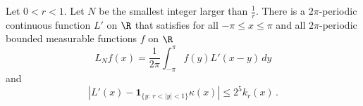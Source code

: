 \begin{lemma}\label{Dirichlet-approximation}
\leanok
{}
Let $0<r<1$. Let $N$ be the smallest
integer larger than $\frac 1r$.
There is a $2\pi$-periodic continuous function
 ${L'}$ on $\R$ that satisfies for all $-\pi\le x\le \pi$
and all $2\pi$-periodic bounded measurable functions $f$ on $\R$
\begin{equation}\label{lthroughlprime}
    L_Nf(x)=\frac 1{2\pi}\int_{-\pi}^{\pi}f(y) {L'}(x-y)\, dy
\end{equation}
and
\begin{equation}\label{eqdifflhil}
    \left|L'(x)-\mathbf{1}_{\{y:\, r<|y|<1\}} \kappa(x)\right|\le 2^{5}k_r(x)\, .
\end{equation}
\end{lemma}


